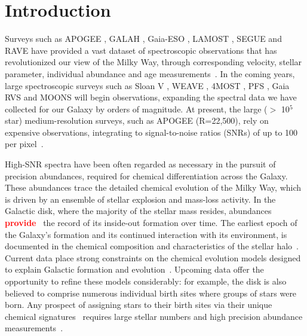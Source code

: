 \documentclass[a4paper,fleqn,usenatbib]{mnras}
\newcommand\edit[1]{\textcolor{red}{\textbf{#1}}}
\begin{document}

\section{Introduction}
\label{sec:intro}

Surveys such as APOGEE \citep{Majewski2017}, GALAH \citep{deSilva2015}, Gaia-ESO \citep{Gilmore2012}, LAMOST \citep{Newberg2012}, SEGUE \citep{Yanny2009} and RAVE \citep{Steinmetz2006} have provided a vast dataset of spectroscopic observations that has revolutionized our view of the Milky Way, through corresponding velocity, stellar parameter, individual abundance and age measurements~\citep[e.g.][]{Nidever2014,Minchev2014a,Hayden2015,Kord2015,Ho2017,Frankel2018,Bovy2019,Ted2019a,BH2019}. In the coming years, large spectroscopic surveys such as Sloan V \citep{Kollmeier2017}, WEAVE \citep{Bonifacio2016}, 4MOST \citep{deJong2016}, PFS \citep{PFS2016}, Gaia RVS \citep{Gaia2016} and MOONS \citep{C2014} will begin observations, expanding the spectral data we have collected for our Galaxy by orders of magnitude. At present, the large ($>$ 10$^5$ star) medium-resolution surveys, such as APOGEE (R=22,500), rely on expensive observations, integrating to signal-to-noise ratios (SNRs) of up to 100 per pixel~\citep{Zasowski2013,Zasowski2017}. 

High-SNR spectra have been often regarded as necessary in the pursuit of precision abundances, required for  chemical differentiation across the Galaxy.  These abundances trace the detailed chemical evolution of the Milky Way, which is driven by an ensemble of stellar explosion and mass-loss activity. In the Galactic disk, where the majority of the stellar mass resides, abundances \edit{provide}~\citep{Rix2013,BH2016} the record of its inside-out formation over time. The earliest epoch of the Galaxy's formation and its continued interaction with its environment, is documented in the chemical composition and characteristics of the stellar halo~\citep[e.g.][]{Keith2015,Payel2019, Helmi2018}.  Current data place strong constraints on the chemical evolution models designed to explain Galactic formation and evolution~\citep[e.g.][]{Minchev2013,Minchev2014b,Robyn2018, Weinberg2019, Clarke2019, Blancato2019}. Upcoming data offer the opportunity to refine these models considerably: for example, the disk is also believed to comprise  numerous individual birth sites where groups of stars were born. Any prospect of assigning stars to their birth sites via their unique chemical signatures~\citep[e.g.][]{BH2010} requires large stellar numbers and high precision abundance measurements~\citep{Mits2013, Ting2015, Hogg2016, Arm2018}. 
\end{document}

